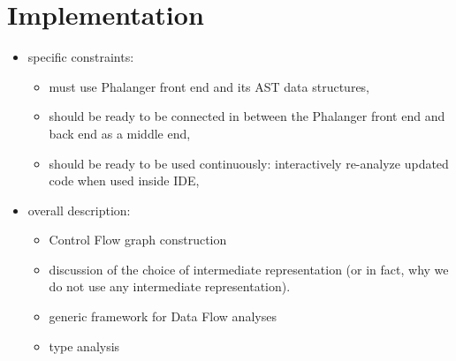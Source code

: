 \chapter{Implementation}

\begin{itemize}
    \item[] specific constraints: 
        \begin{itemize}
            \item[] must use Phalanger front end and its AST data structures,
            \item[] should be ready to be connected in between the Phalanger front end and back end as a middle end,
            \item[] should be ready to be used continuously: interactively re-analyze updated code when used inside IDE,
        \end{itemize}
    \item[] overall description:
        \begin{itemize}
            \item[] Control Flow graph construction
            \item[] discussion of the choice of intermediate representation (or in fact, why we do not use any intermediate representation).
            \item[] generic framework for Data Flow analyses
            \item[] type analysis
        \end{itemize}
\end{itemize}